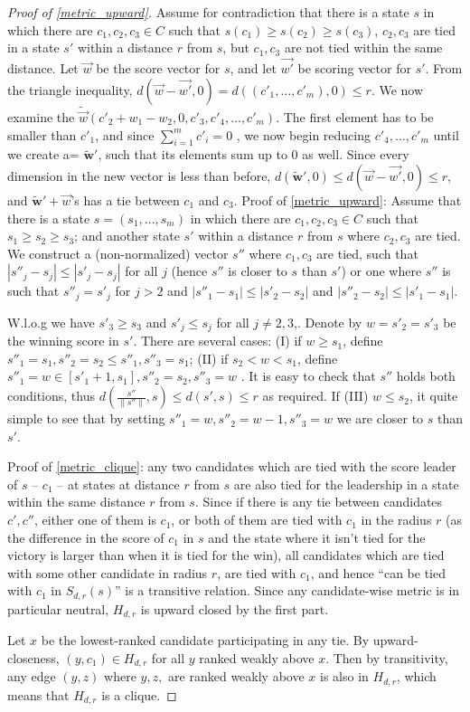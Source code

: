 \documentclass[letterpaper]{article} %
\begin{document}
\begin{proof}[Proof of \ref{metric_upward}]
Assume for contradiction that there is a state $s$ in which there are $c_1,c_{2},c_{3}\in C$ such that $s(c_{1})\geq s(c_{2})\geq s(c_{3})$, $c_2,c_3$ are tied in a state $s'$ within a distance $r$ from $s$, but $c_{1},c_{3}$ are not tied within the same distance. Let $\vec{w}$ be the score vector for $s$, and let $\vec{w'}$ be scoring vector for $s'$. From the triangle inequality, $d(\vec{w}-\vec{w'},0)=d((c'_{1},\ldots,c'_{m}),0)\leq r$. We now examine the $\tilde{\vec{w}}(c'_{2}+w_{1}-w_{2},0,c'_{3},c'_{4},\ldots,c'_{m})$. The first element has to be smaller than $c'_{1}$, and since $\sum_{i=1}^{m}c'_{i}=0$	, we now begin reducing $c'_{4},\ldots,c'_{m}$ until we create a= $\boldsymbol{\tilde{w}'}$, such that its elements sum up to $0$ as well. Since every dimension in the new vector is less than before, $d(\boldsymbol{\tilde{w}'},0)\leq d(\vec{w}-\vec{w'},0)\leq r$, and $\boldsymbol{\tilde{w}'}+\vec{w}$'s has a tie between $c_{1}$ and $c_{3}$.
Proof of \ref{metric_upward}: Assume that there is a state $s=(s_1,\ldots,s_m)$ in which there are $c_1,c_{2},c_{3}\in C$ such that $s_{1}\geq s_{2}\geq s_{3}$; and another state $s'$ within a distance $r$ from $s$ where $c_2,c_3$ are tied. We construct a (non-normalized) vector $s''$ where $c_1,c_3$ are tied, such that $|s''_j-s_j|\leq |s'_j-s_j|$ for all $j$ (hence $s''$ is closer to $s$ than $s'$) or one where $s''$ is such that $s''_{j}=s'_{j}$ for $j>2$ and $|s''_{1}-s_{1}|\leq|s'_{2}-s_{2}|$ and $|s''_{2}-s_{2}|\leq |s'_{1}-s_{1}|$. 

W.l.o.g we have $s'_3\geq s_3$ and $s'_j\leq s_j$ for all $j\neq 2,3$,. Denote by $w=s'_2=s'_3$ be the winning score in $s'$. There are several cases: (I) if $w\geq s_1$, define $s''_1=s_1, s''_2=s_2\leq s''_1, s''_3 = s_1$; (II) if $s_{2}<w<s_1$, define $s''_1 = w\in [s'_1+1,s_1], s''_2 = s_{2}, s''_3=w$ . It is easy to check that $s''$ holds both conditions, thus $d(\frac{s''}{\|s''\|},s)\leq d(s',s)\leq r$ as required. If (III) $w\leq s_{2}$, it quite simple to see that by setting $s''_{1}=w, s''_{2}=w-1,s''_{3}=w$ we are closer to $s$ than $s'$.

Proof of \ref{metric_clique}: any two candidates which are tied with the score leader of $s$ -- $c_{1}$ -- at states at distance $r$ from $s$ are also tied for the leadership in a state within the same distance $r$ from $s$. Since if there is any tie between candidates $c',c''$, either one of them is $c_{1}$, or both of them are tied with $c_{1}$ in the radius $r$ (as the difference in the score of $c_{1}$ in $s$ and the state where it isn't tied for the victory is larger than when it is tied for the win), all candidates which are tied with some other candidate in radius $r$, are tied with $c_{1}$, and hence ``can be tied with $c_1$ in $S_{d,r}(s)$'' is a transitive relation. Since any candidate-wise metric is in particular neutral, $H_{d,r}$ is upward closed by the first part. 

Let $x$ be the lowest-ranked candidate participating in any tie. By upward-closeness, $(y,c_1)\in H_{d,r}$ for all $y$ ranked weakly above $x$. Then by transitivity, any edge $(y,z)$ where $y,z,$ are ranked weakly above $x$ is also in $H_{d,r}$, which means that $H_{d,r}$ is a clique. 
 \end{proof}
\end{document}
